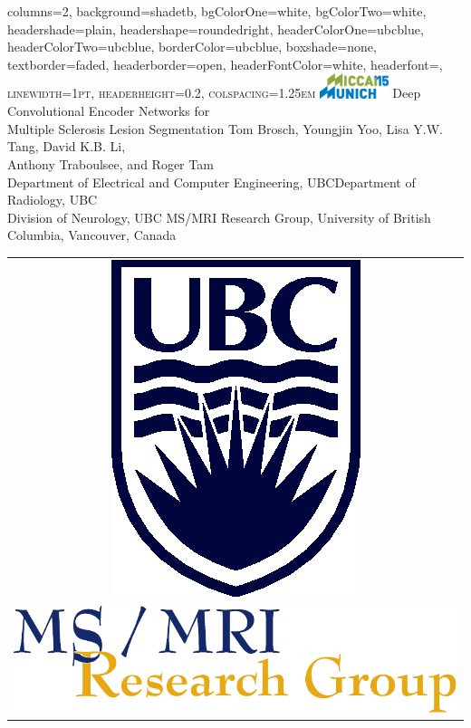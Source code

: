\documentclass[%
portrait,paperwidth=841mm,paperheight=1180mm,%
margin=2cm,
fontscale=0.32
]{baposter}
\begin{document}
\begin{poster}{
  columns=2,
  background=shadetb,
  bgColorOne=white,
  bgColorTwo=white,
  headershade=plain,
  headershape=roundedright,
  headerColorOne=ubcblue,
  headerColorTwo=ubcblue,
  borderColor=ubcblue,
  boxshade=none,
  textborder=faded,
  headerborder=open,
  headerFontColor=white,
  headerfont=\scshape\Large,
  linewidth=1pt,
  headerheight=0.2\textwidth,
  colspacing=1.25em
}
{
\includegraphics[width=0.15\textwidth]{images/Logo_MICCAI15}
}
{
Deep Convolutional Encoder Networks for\\ Multiple Sclerosis Lesion
Segmentation\vspace{0.5em} }
{
\Large
Tom Brosch,
Youngjin Yoo,
Lisa Y.W. Tang,
David K.B. Li,\\
Anthony Traboulsee, and
Roger Tam\\[0.65ex]
\normalsize {}Department of Electrical and Computer Engineering,
UBC\quad {}Department of Radiology, UBC\\[0.65ex]
Division of Neurology, UBC\quad
{}MS/MRI Research Group, University of British Columbia, Vancouver, Canada
}
{
\begin{tabular}{c}
\\
\includegraphics[height=0.07\textwidth]{images/s4b282c}\\
\addlinespace
\includegraphics[height=0.03\textwidth]{images/msmri_simple}
\end{tabular}
}


\end{poster}
\end{document}
